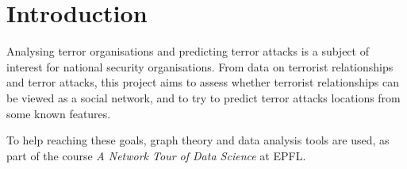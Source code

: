 \section{Introduction}
\label{sec:Introduction}
Analysing terror organisations and predicting terror attacks is a subject of interest for national security organisations. From data on  terrorist relationships and terror attacks, this project aims to assess whether terrorist relationships can be viewed as a social network, and to try to predict terror attacks locations from some known features. 

To help reaching these goals, graph theory and data analysis tools are used, as part of the course \textit{A Network Tour of Data Science} at EPFL.
%


